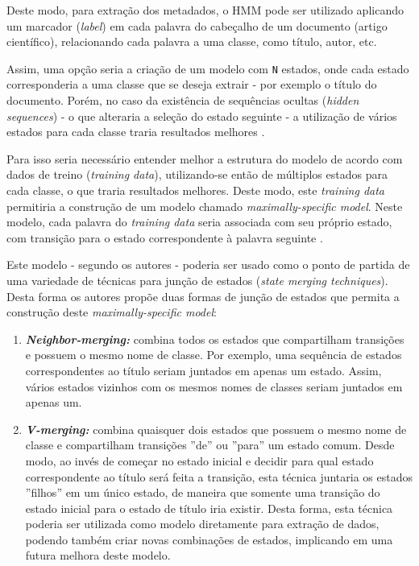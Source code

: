 Deste modo, para extração dos metadados, o HMM pode ser utilizado aplicando um marcador (\textit{label}) em cada palavra do cabeçalho de um documento (artigo científico), relacionando cada palavra a uma classe, como título, autor, etc. \begin{textnew}Assim, uma opção seria a criação de um modelo com \texttt{N} estados, onde cada estado corresponderia a uma classe que se deseja extrair - por exemplo o título do documento. Porém, no caso da existência de sequências ocultas (\textit{hidden sequences}) - o que alteraria a seleção do estado seguinte - a utilização de vários estados para cada classe traria resultados melhores \cite{Seymore-HMM-IE}.


Para isso seria necessário entender melhor a estrutura do modelo de acordo com dados de treino (\textit{training data}), utilizando-se então de múltiplos estados para cada classe, o que traria resultados melhores. Deste modo, este \textit{training data} permitiria a construção de um modelo chamado \textit{maximally-specific model}. Neste modelo, cada palavra do \textit{training data} seria associada com seu próprio estado, com transição para o estado correspondente à palavra seguinte \cite{Seymore-HMM-IE}.

Este modelo - segundo os autores - poderia ser usado como o ponto de partida de uma variedade de técnicas para junção de estados (\textit{state merging techniques}). Desta forma os autores propõe duas formas de junção de estados que permita a construção deste \textit{maximally-specific model}:

\begin{enumerate}

\item \textit{\textbf{Neighbor-merging:}} combina todos os estados que compartilham transições e possuem o mesmo nome de classe. Por exemplo, uma sequência de estados correspondentes ao título seriam juntados em apenas um estado. Assim, vários estados vizinhos com os mesmos nomes de classes seriam juntados em apenas um.

\item \textit{\textbf{V-merging:}} combina quaisquer dois estados que possuem o mesmo nome de classe e compartilham transições ''de'' ou ''para'' um estado comum. Desde modo, ao invés de começar no estado inicial e decidir para qual estado correspondente ao título será feita a transição, esta técnica juntaria os estados ''filhos'' em um único estado, de maneira que somente uma transição do estado inicial para o estado de título iria existir. Desta forma, esta técnica poderia ser utilizada como modelo diretamente para extração de dados, podendo também criar novas combinações de estados, implicando em uma futura melhora deste modelo.


\end{enumerate}
\end{textnew}
